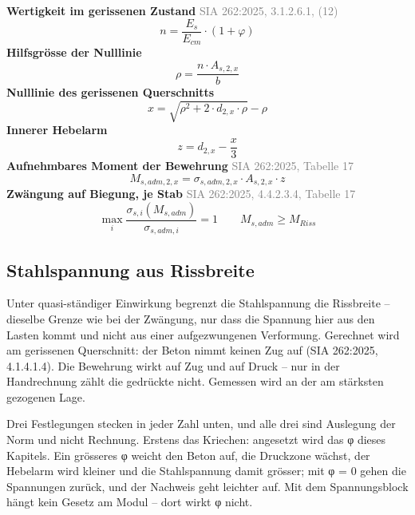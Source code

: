 \documentclass[11pt,a4paper]{article}
\newcommand{\normref}[1]{{\small\textcolor{gray}{#1}}}
\begin{document}
\noindent\textbf{Wertigkeit im gerissenen Zustand} \hfill \normref{SIA 262:2025, 3.1.2.6.1, (12)}
\begin{equation*}
n = \frac{E_s}{E_{cm}} \cdot \left(1 + \varphi\right)
\end{equation*}
\noindent\textbf{Hilfsgrösse der Nulllinie}
\begin{equation*}
\rho = \frac{n \cdot A_{s,2,x}}{b}
\end{equation*}
\noindent\textbf{Nulllinie des gerissenen Querschnitts}
\begin{equation*}
x = \sqrt{\rho^{2} + 2 \cdot d_{2,x} \cdot \rho} - \rho
\end{equation*}
\noindent\textbf{Innerer Hebelarm}
\begin{equation*}
z = d_{2,x} - \frac{x}{3}
\end{equation*}
\noindent\textbf{Aufnehmbares Moment der Bewehrung} \hfill \normref{SIA 262:2025, Tabelle 17}
\begin{equation*}
M_{s,adm,2,x} = \sigma_{s,adm,2,x} \cdot A_{s,2,x} \cdot z
\end{equation*}
\noindent\textbf{Zwängung auf Biegung, je Stab} \hfill \normref{SIA 262:2025, 4.4.2.3.4, Tabelle 17}
\begin{equation*}
\max_i \frac{\sigma_{s,i}(M_{s,adm})}{\sigma_{s,adm,i}} = 1\qquad M_{s,adm} \ge M_{Riss}
\end{equation*}
\subsection{Stahlspannung aus Rissbreite}
Unter quasi-ständiger Einwirkung begrenzt die Stahlspannung die Rissbreite – dieselbe Grenze wie bei der Zwängung, nur dass die Spannung hier aus den Lasten kommt und nicht aus einer aufgezwungenen Verformung. Gerechnet wird am gerissenen Querschnitt: der Beton nimmt keinen Zug auf (SIA 262:2025, 4.1.4.1.4). Die Bewehrung wirkt auf Zug und auf Druck – nur in der Handrechnung zählt die gedrückte nicht. Gemessen wird an der am stärksten gezogenen Lage.

Drei Festlegungen stecken in jeder Zahl unten, und alle drei sind Auslegung der Norm und nicht Rechnung. Erstens das Kriechen: angesetzt wird das φ dieses Kapitels. Ein grösseres φ weicht den Beton auf, die Druckzone wächst, der Hebelarm wird kleiner und die Stahlspannung damit grösser; mit φ = 0 gehen die Spannungen zurück, und der Nachweis geht leichter auf. Mit dem Spannungsblock hängt kein Gesetz am Modul – dort wirkt φ nicht.
\end{document}

